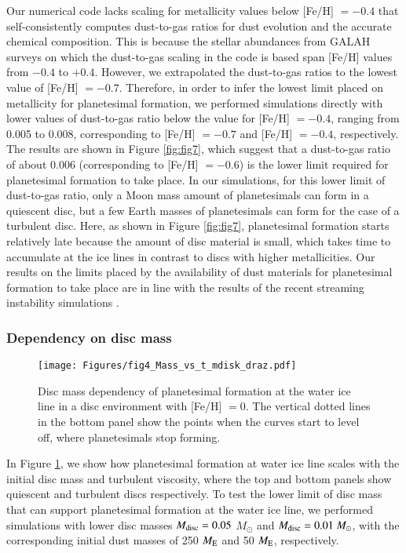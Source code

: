 \documentclass{aa}
\begin{document}
Our numerical code lacks scaling for metallicity values below [Fe/H] $=-0.4$ that self-consistently computes dust-to-gas ratios for dust evolution and the accurate chemical composition.  This is because the stellar abundances from GALAH surveys \citep{Buder2018} on which the dust-to-gas scaling in the code is based \citep{BitschBattistini2020, SchneiderBitsch2021} span [Fe/H] values from $-0.4$ to $+0.4$. However, we extrapolated the dust-to-gas ratios to the lowest value of [Fe/H] $=-0.7$.  Therefore, in order to infer the lowest limit placed on metallicity for planetesimal formation, we performed simulations directly with lower values of dust-to-gas ratio below the value for  [Fe/H] $=-0.4$, ranging from 0.005 to 0.008, corresponding to [Fe/H] $=-0.7$ and [Fe/H] $=-0.4$, respectively. The results are shown in Figure \ref{fig:fig7}, which suggest that a dust-to-gas ratio of about 0.006 (corresponding to [Fe/H] $=-0.6$) is the lower limit required for planetesimal formation to take place. In our simulations, for this lower limit of dust-to-gas ratio, only a Moon mass amount of planetesimals can form in a quiescent disc, but a few Earth masses of planetesimals can form for the case of a turbulent disc.  Here, as shown in Figure \ref{fig:fig7}, planetesimal formation starts relatively late because  the amount of disc material is small, which takes time to accumulate at the ice lines in contrast to discs with higher metallicities. Our results on the limits placed by the availability of dust materials for planetesimal formation to take place are in line with the results of the recent streaming instability simulations \citep{LiYoudin2021}.

\subsubsection{Dependency on disc mass}
\begin{figure}
   \texttt{[image: Figures/fig4\_Mass\_vs\_t\_mdisk\_draz.pdf]}
   \caption{Disc mass dependency of planetesimal formation at the water ice line in a disc environment with [Fe/H] $= 0$. The vertical dotted lines in the bottom panel show the points when the curves start to level off, where planetesimals stop forming.}
   \label{fig:fig4}
\end{figure}

In Figure \ref{fig:fig4}, we show how planetesimal formation at water ice line scales with the initial disc mass and turbulent viscosity, where  the top and bottom panels show quiescent and turbulent discs respectively. To test the lower limit of disc mass that can support planetesimal formation at the water ice line, we performed simulations with lower disc masses $M_{\rm{disc}}= 0.05$ $M_{\odot}$ and $M_{\rm{disc}}=0.01~M_{\odot}$, with the corresponding initial dust masses of 250 $M_{\rm{E}}$ and 50 $M_{\rm{E}}$, respectively.
\end{document}
